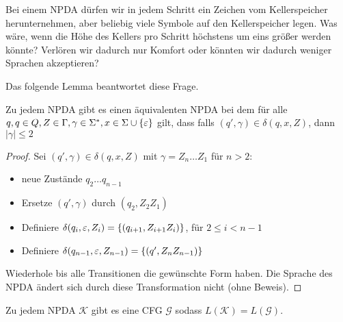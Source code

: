 Bei einem \ac{NPDA} dürfen wir in jedem Schritt ein Zeichen vom Kellerspeicher herunternehmen,
aber beliebig viele Symbole auf den Kellerspeicher legen.
Was wäre, wenn die Höhe des Kellers pro Schritt höchstens um eins größer werden könnte?
Verlören wir dadurch nur Komfort oder könnten wir dadurch weniger Sprachen akzeptieren?

Das folgende Lemma beantwortet diese Frage.
\begin{lemma}\label{lem:4.limitStackIncrease}
        Zu jedem \ac{NPDA} gibt es einen äquivalenten \ac{NPDA} bei dem
        für alle $q,q\in Q, Z\in\Gamma, \gamma\in\Sigma^*, x\in\Sigma\cup\{\varepsilon\}$
        gilt, dass falls $(q',\gamma)\in\delta(q,x,Z)$, dann $|\gamma| \le 2$
\end{lemma}
\begin{proof}
        Sei $(q',\gamma)\in\delta(q,x,Z)$ mit $\gamma = Z_n\dots Z_1$ für $n>2$:
        \begin{itemize}
        \item   neue Zustände $q_2\dots q_{n-1}$
        \item Ersetze $(q',\gamma)$ durch $(q_2, Z_2Z_1)$
        \item Definiere $\delta(q_i, \varepsilon, Z_i) = \{ (q_{i+1}, Z_{i+1}Z_i) \}$, für $2\le i < n-1$
        \item Definiere $\delta(q_{n-1}, \varepsilon, Z_{n-1}) = \{ (q', Z_nZ_{n-1}) \}$
        \end{itemize}
        Wiederhole bis alle Transitionen die gewünschte Form haben.
        Die Sprache des \ac{NPDA} ändert sich durch diese Transformation nicht (ohne Beweis).\qedhere
\end{proof}


\begin{lemma}\label{lem:4.npdaToCfg}
 Zu jedem \ac{NPDA} $\mathcal{K}$ gibt es eine \ac{CFG} $\mathcal{G}$  sodass $L(\mathcal{K})=L(\mathcal{G})$.
\end{lemma}

